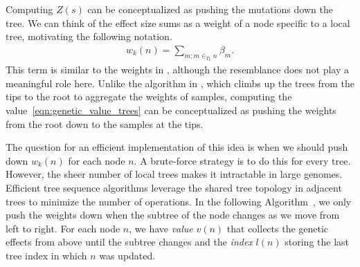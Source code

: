 Computing $Z(s)$ can be conceptualized as pushing the mutations down the tree.
%
We can think of the effect size sums as a weight of a node specific to a local tree,
motivating the following notation.
%
\begin{align}
    w_k(n) = \sum_{m: m \in_{T_k} n} \beta_m .
\end{align}
%
This term is similar to the weights in \citet{ralph2020efficiently},
although the resemblance does not play a meaningful role here.
%
Unlike the algorithm in \citet{ralph2020efficiently},
which climbs up the trees from the tips to the root to aggregate the weights of samples,
computing the value~\eqref{eqn:genetic_value_trees} can be conceptualized as
pushing the weights from the root down to the samples at the tips.

The question for an efficient implementation of this idea
is when we should push down $w_k(n)$ for each node $n$.
%
A brute-force strategy is to do this for every tree.
%
However, the sheer number of local trees makes it intractable in large genomes.
%
Efficient tree sequence algorithms leverage the shared tree topology
in adjacent trees to minimize the number of operations.
%
In the following Algorithm~,
we only push the weights down when the subtree of the node changes
as we move from left to right.
%
For each node $n$, we have \textit{value} $v(n)$ that collects the genetic effects from above until the subtree changes and
the \textit{index} $l(n)$ storing the last tree index in which $n$ was updated.

